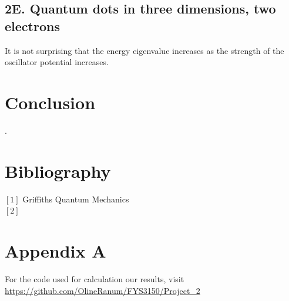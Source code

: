 \documentclass[%
reprint,
amsmath,amssymb,
aps,
]{revtex4-1}
\begin{document}
\subsection*{2E. Quantum dots in three dimensions, two electrons} \noindent 
It is not surprising that the energy eigenvalue increases as the strength of the oscillator potential increases. 


\section*{Conclusion}


\newpage .
\newpage 
\onecolumngrid
\section*{Bibliography}
\noindent $[1]$ Griffiths Quantum Mechanics\\ 
$[2]$
\section*{Appendix A}
For the code used for calculation our results, visit
\url{https://github.com/OlineRanum/FYS3150/Project_2}
\newpage 
\end{document}
